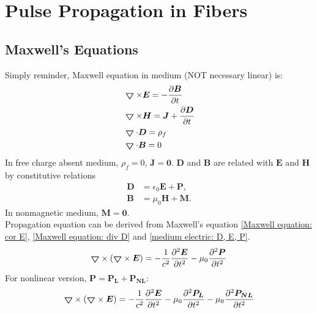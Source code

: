 \documentclass[12pt]{extarticle}
\numberwithin{equation}{section}
\numberwithin{figure}{section}
\numberwithin{table}{section}
\newcommand{\<}{\langle}
\renewcommand{\>}{\rangle}
\theoremstyle{definition}
\newcommand{\Lap}{\boldsymbol{\bigtriangledown}}
\begin{document}
\newpage
\section{Pulse Propagation in Fibers}
    \subsection{Maxwell's Equations}
        Simply reminder, Maxwell equation in medium (NOT necessary linear) is:
        \begin{subequations}
        \label{Maxwell's equation}
            \begin{align}
                &\boldsymbol{\bigtriangledown} \times \boldsymbol{E} = -\pdv{\boldsymbol{B}}{t} \label{Maxwell equation: cor E} \\
                &\boldsymbol{\bigtriangledown} \times \boldsymbol{H} = \boldsymbol{J} + \pdv{\boldsymbol{D}}{t} \label{Maxwell equation: cor H}\\
                &\boldsymbol{\bigtriangledown} \cdot \boldsymbol{D} = \rho_f \label{Maxwell equation: div D}\\
                &\boldsymbol{\bigtriangledown} \cdot \boldsymbol{B} = 0 \label{Maxwell equation: div B}
            \end{align}
        \end{subequations}
        In free charge absent medium, $\rho_f=0$, $\boldsymbol{J}=\boldsymbol{0}$. $\boldsymbol{D}$ and $\boldsymbol{B}$ are related with $\boldsymbol{E}$ and $\boldsymbol{H}$ by constitutive relations
        \begin{subequations}
            \label{Medium electric relations}
            \begin{align}
                \boldsymbol{D} &= \epsilon_0 \boldsymbol{E} + \boldsymbol{P}, \label{medium electric: D, E, P}\\
                \boldsymbol{B} &= \mu_0 \boldsymbol{H} + \boldsymbol{M}. \label{medium electric: B, H, M}
            \end{align}
        \end{subequations}
        In nonmagnetic medium, $\boldsymbol{M}=\boldsymbol{0}$.\\
        Propagation equation can be derived from Maxwell's equation \autoref{Maxwell equation: cor E}, \autoref{Maxwell equation: div D} and \autoref{medium electric: D, E, P}.\\
            \begin{equation}
                \Lap \times (\Lap\times\boldsymbol{E}) = -\frac{1}{c^2}\pdv[2]{\boldsymbol{E}}{t}-\mu_0\pdv[2]{\boldsymbol{P}}{t}
            \end{equation}
        For nonlinear version, $\boldsymbol{P} = \boldsymbol{P_L}+\boldsymbol{P_{NL}}$:
            \begin{equation}
                \Lap \times (\Lap\times\boldsymbol{E}) = -\frac{1}{c^2}\pdv[2]{\boldsymbol{E}}{t}-\mu_0\pdv[2]{\boldsymbol{P_L}}{t}-\mu_0\pdv[2]{\boldsymbol{P_{NL}}}{t}
            \end{equation}
            
\end{document}
